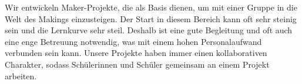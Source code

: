 \markdownRendererDocumentBegin
\markdownRendererSectionBegin
\markdownRendererSectionBegin
{}\markdownRendererInterblockSeparator
{}Wir entwickeln Maker-Projekte, die als Basis dienen, um mit einer Gruppe in die Welt des Makings einzusteigen. Der Start in diesem Bereich kann oft sehr steinig sein und die Lernkurve sehr steil. Deshalb ist eine gute Begleitung und oft auch eine enge Betreuung notwendig, was mit einem hohen Personalaufwand verbunden sein kann. Unsere Projekte haben immer einen kollaborativen Charakter, sodass Schülerinnen und Schüler gemeinsam an einem Projekt arbeiten.
\markdownRendererSectionEnd 
\markdownRendererSectionEnd \markdownRendererDocumentEnd